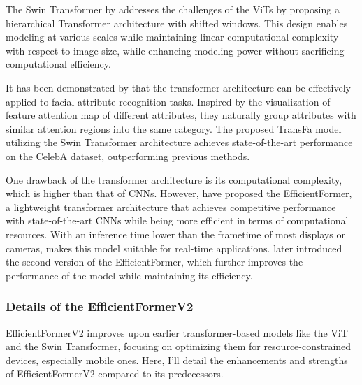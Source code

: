 \documentclass[a4paper,oneside]{article}
\begin{document}
The Swin Transformer by \citet{DBLP:journals/corr/abs-2103-14030} addresses the challenges of the ViTs by proposing a hierarchical Transformer architecture with shifted windows.
This design enables modeling at various scales while maintaining linear computational complexity with respect to image size, while enhancing modeling power without sacrificing computational efficiency.

It has been demonstrated by \citet{liu2022transfa} that the transformer architecture can be effectively applied to facial attribute recognition tasks.
Inspired by the visualization of feature attention map of different attributes, they naturally group attributes with similar attention regions into the same category.
The proposed TransFa model utilizing the Swin Transformer architecture achieves state-of-the-art performance on the CelebA dataset, outperforming previous methods.

One drawback of the transformer architecture is its computational complexity, which is higher than that of CNNs.
However, \citet{li2022efficientformer} have proposed the EfficientFormer, a lightweight transformer architecture that achieves competitive performance with state-of-the-art CNNs while being more efficient in terms of computational resources.
With an inference time lower than the frametime of most displays or cameras, makes this model suitable for real-time applications.
\citet{li2022rethinking} later introduced the second version of the EfficientFormer, which further improves the performance of the model while maintaining its efficiency.

\subsubsection{Details of the EfficientFormerV2}
\label{sec:efficientformerv2}
EfficientFormerV2 improves upon earlier transformer-based models like the ViT and the Swin Transformer, focusing on optimizing them for resource-constrained devices, especially mobile ones.
Here, I'll detail the enhancements and strengths of EfficientFormerV2 compared to its predecessors.
\end{document}
